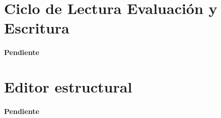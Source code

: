 \nwenddocs{}\section*{Ciclo de Lectura Evaluación y Escritura}

\paragraph{Pendiente}

\nwenddocs{}\section*{Editor estructural}

\paragraph{Pendiente}

\nwenddocs{}

